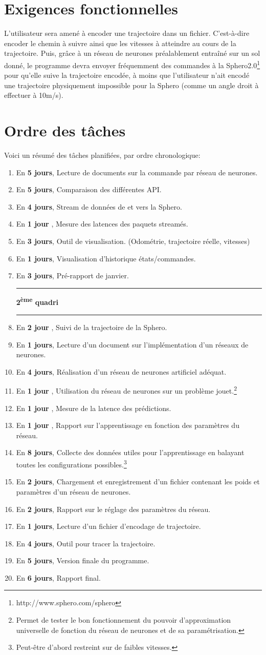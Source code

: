 \documentclass[a4paper, 12pt]{report}
\newcommand{\dure}[1]{\item En \textbf{#1},}
\newcommand{\rul}{\rule{5cm}{0.3mm}}
\begin{document}


\section*{Exigences fonctionnelles}
L'utilisateur sera amené à encoder une trajectoire dans un fichier. C'est-à-dire encoder le chemin à suivre ainsi que les vitesses à atteindre au cours de la trajectoire.
Puis, grâce à un réseau de neurones préalablement entraîné sur un sol donné, le programme devra envoyer fréquemment des commandes à la Sphero2.0\footnote{http://www.sphero.com/sphero} pour qu'elle suive la trajectoire encodée, à moins que l'utilisateur n'ait encodé une trajectoire physiquement impossible pour la Sphero (comme un angle droit à effectuer à 10m/s).

\section*{Ordre des tâches}
Voici un résumé des tâches planifiées, par ordre chronologique:
\begin{enumerate}
 \dure{5 jours} Lecture de documents sur la commande par réseau de neurones.
 \dure{5 jours} Comparaison des différentes API.
 \dure{4 jours} Stream de données de et vers la Sphero.
 \dure{1 jour } Mesure des latences des paquets streamés.
 \dure{3 jours} Outil de visualisation. (Odométrie, trajectoire réelle, vitesses)
 \dure{1 jours} Visualisation d'historique états/commandes.
 \dure{3 jours} Pré-rapport de janvier.\\ \rul\textbf{2\textsuperscript{ème} quadri}\rul
 \dure{2 jour } Suivi de la trajectoire de la Sphero.
 \dure{1 jours} Lecture d'un document sur l'implémentation d'un réseaux de neurones.
 \dure{4 jours} Réalisation d'un réseau de neurones artificiel adéquat.
 \dure{1 jour } Utilisation du réseau de neurones sur un problème jouet.\footnote{Permet de tester le bon fonctionnement du pouvoir d'approximation universelle de fonction du réseau de neurones et de sa paramétrisation.}
 \dure{1 jour } Mesure de la latence des prédictions.
 \dure{1 jour } Rapport sur l'apprentissage en fonction des paramètres du réseau.
 \dure{8 jours} Collecte des données utiles pour l'apprentissage en balayant toutes les configurations possibles.\footnote{Peut-être d'abord restreint sur de faibles vitesses.}
 \dure{2 jours} Chargement et enregistrement d'un fichier contenant les poids et paramètres d'un réseau de neurones.
 \dure{2 jours} Rapport sur le réglage des paramètres du réseau.
 \dure{1 jours} Lecture d'un fichier d'encodage de trajectoire.
 \dure{4 jours} Outil pour tracer la trajectoire.
 \dure{5 jours} Version finale du programme.
 \dure{6 jours} Rapport final.
\end{enumerate}
\end{document}
